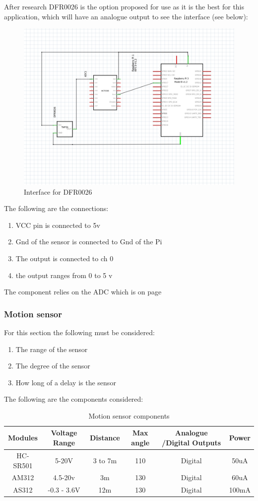 \newpage

After research DFR0026 \cite{DFR0026} is the option proposed for use as it is the best for this application,  which will have an analogue  output to see the interface (see below):

\begin{figure}[h!]
	\centering
	\includegraphics[width=0.6\linewidth]{Images/InterfaceofDFR0026.png}
	\caption{Interface for  DFR0026}
	\label{Interface for  DFR0026}
\end{figure}

The following are  the connections:
\begin{enumerate}
	\item VCC pin is connected  to 5v
	\item Gnd of the  sensor is connected to Gnd of the Pi
	\item The output is connected to  ch 0
	\item the output ranges  from  0 to  5 v
\end{enumerate}
The component relies on the  ADC  which  is on page\pageref{Adc section}

\subsubsection{Motion sensor}

For this section the following must be considered:
\begin{enumerate}
	\item The range of the  sensor
	\item The degree of the  sensor
	\item How long of a  delay is the sensor
\end{enumerate}
The  following are  the components considered:
\begin{table}[h!]
	\centering
	\begin{tabular}{|c|c|c|c|c|c|}
		\hline
		Modules & Voltage Range & Distance & Max angle & Analogue /Digital Outputs & Power \\
		\hline
		HC-SR501 & 5-20V & 3 to 7m & 110 & Digital & 50uA \\
		AM312 & 4.5-20v & 3m & 130 & Digital & 60uA \\
		AS312 & -0.3 - 3.6V & 12m & 130 & Digital & 100mA \\
		\hline
	\end{tabular}
	\caption{Motion sensor components}
	\label{Motion sensor components}
\end{table}

